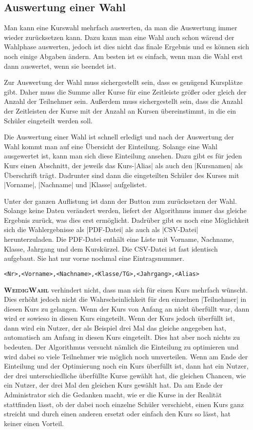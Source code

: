 \documentclass[ngerman]{ltxdoc}
\newcommand{\name}{\textbf{\textsc{WeidigWahl}}\xspace}
\begin{document}
\subsection{Auswertung einer Wahl}

Man kann eine Kurswahl mehrfach auswerten, da man die Auswertung immer wieder
zurücksetzen kann. Dazu kann man eine Wahl auch schon wärend der Wahlphase auswerten,
jedoch ist dies nicht das finale Ergebnis und es können sich noch einige Abgaben
ändern. Am besten ist es einfach, wenn man die Wahl erst dann auswertet, wenn sie
beendet ist.

Zur Auswertung der Wahl muss sichergestellt sein, dass es genügend Kursplätze gibt.
Daher muss die Summe aller Kurse für eine Zeitleiste größer oder gleich der
Anzahl der Teilnehmer sein. Außerdem muss sichergestellt sein, dass die Anzahl
der Zeitleisten der Kurse mit der Anzahl an Kursen übereinstimmt, in die ein Schüler
eingeteilt werden soll.

Die Auswertung einer Wahl ist schnell erledigt und nach der Auswertung der Wahl
kommt man auf eine Übersicht der Einteilung. Solange eine Wahl ausgewertet ist,
kann man sich diese Einteilung ansehen. Dazu gibt es für jeden Kurs einen Abschnitt,
der jeweils das Kurs-|Alias| als auch den |Kursnamen| als Überschrift trägt.
Dadrunter sind dann die eingeteilten Schüler des Kurses mit |Vorname|, |Nachname|
und |Klasse| aufgelistet.

Unter der ganzen Auflistung ist dann der Button zum zurücksetzen der Wahl. Solange
keine Daten verändert werden, liefert der Algorithmus immer das gleiche Ergebnis
zurück, was dies erst ermöglicht. Dadrüber gibt es noch eine Möglichkeit sich
die Wahlergebnisse als |PDF-Datei| als auch als |CSV-Datei| herunterzuladen. Die
PDF-Datei enthält eine Liste mit Vorname, Nachname, Klasse, Jahrgang und dem
Kurskürzel. Die CSV-Datei ist fast identisch aufgebaut. Sie hat nur vorne nochmal
eine Eintragsnummer.

\begin{lstlisting}[style=tex]
<Nr>,<Vorname>,<Nachname>,<Klasse/TG>,<Jahrgang>,<Alias>
\end{lstlisting}

\name verhindert nicht, dass man sich für einen Kurs mehrfach wünscht. Dies erhöht
jedoch nicht die Wahrscheinlichkeit für den einzelnen |Teilnehmer| in diesen Kurs
zu gelangen. Wenn der Kurs von Anfang an nicht überfüllt war, dann wird er sowieso
in diesen Kurs eingeteilt. Wenn der Kurs jedoch überfüllt ist, dann wird ein Nutzer,
der als Beispiel drei Mal das gleiche angegeben hat, automatisch am Anfang in diesen
Kurs eingeteilt. Dies hat aber noch nichts zu bedeuten. Der Algorithmus versucht
nämlich die Einteilung zu optimieren und wird dabei so viele Teilnehmer wie möglich
noch umverteilen. Wenn am Ende der Einteilung und der Optimierung noch ein Kurs
überfüllt ist, dann hat ein Nutzer, der drei unterschiedliche überfüllte Kurse
gewählt hat, die gleichen Chancen, wie ein Nutzer, der drei Mal den gleichen
Kurs gewählt hat. Da am Ende der Administrator sich die Gedanken macht, wie er
die Kurse in der Realität stattfinden lässt, ob der dabei noch einzelne Schüler
verschiebt, einen Kurs ganz streicht und durch einen anderen ersetzt oder einfach
den Kurs so lässt, hat keiner einen Vorteil.
\end{document}
